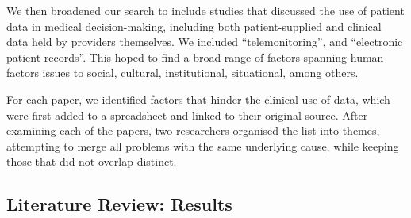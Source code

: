 \documentclass{sigchi}
\begin{document}
We then broadened our search to include studies that discussed the use of patient data in medical decision-making, including both patient-supplied and clinical data held by providers themselves.  We included ``telemonitoring'', and ``electronic patient records''.  This  hoped to find a broad range of factors spanning human-factors issues to social, cultural, institutional, situational, among others.

For each paper, we identified factors that hinder the clinical use of data, which were first added to a spreadsheet and linked to their original source.  After examining each of the papers, two researchers organised the list into themes, attempting to merge all problems with the same underlying cause, while keeping those that did not overlap distinct.  %

\subsection{Literature Review: Results}
\end{document}
